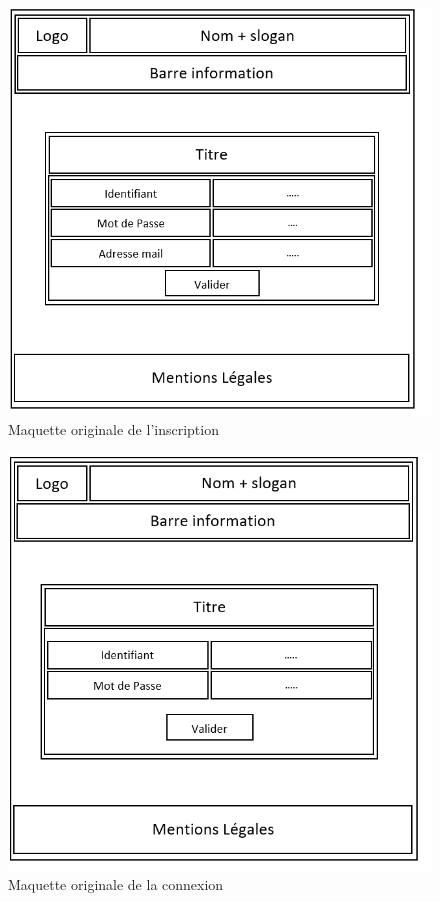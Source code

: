 \documentclass[a4paper,11pt]{article}
\begin{document}
\begin{figure}[H]
  \includegraphics[width=\linewidth]{images/maquette-inscription-original.png}
  \caption{Maquette originale de l'inscription}
  \label{fig:maquette-inscription-original}
\end{figure}

\begin{figure}[H]
  \includegraphics[width=\linewidth]{images/maquette-connexion-original.png}
  \caption{Maquette originale de la connexion}
  \label{fig:maquette-connexion-original}
\end{figure}
\end{document}
